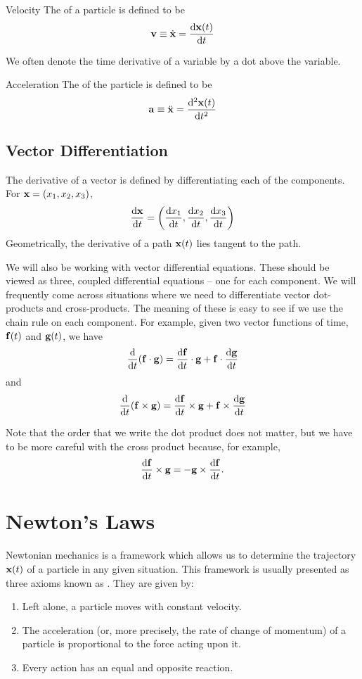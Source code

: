 \begin{defn}{Velocity}{}
The  of a particle is defined to be
\begin{equation}
\vb{v} \equiv \dot{\vb{x}} = \dv{\vb{x}(t)}{t}
\end{equation}
\end{defn}

\begin{notation}
We often denote the time derivative of a variable by a dot above the variable.
\end{notation}

\begin{defn}{Acceleration}{}
The  of the particle is defined to be
\begin{equation}
\vb{a} \equiv \ddot{\vb{x}} = \dv[2]{\vb{x}(t)}{t}
\end{equation}
\end{defn}

\subsection*{Vector Differentiation}
The derivative of a vector is defined by differentiating each of the components. For $\vb{x} = (x_1, x_2, x_3)$,
\[ \dv{\vb{x}}{t} = \left(\dv{x_1}{t}, \dv{x_2}{t}, \dv{x_3}{t}\right) \]
Geometrically, the derivative of a path $\vb{x}(t)$ lies tangent to the path.

We will also be working with vector differential equations. These should be viewed as three, coupled differential equations -- one for each component. We will frequently come across situations where we need to differentiate vector dot-products and cross-products. The meaning of these is easy to see if we use the chain rule on each component. For example, given two vector functions of time, $\vb{f}(t)$ and $\vb{g}(t)$, we have
\[ \odv*{(\vb{f}\cdot\vb{g})}{t} = \dv{\vb{f}}{t}\cdot \vb{g}+\vb{f}\cdot\dv{\vb{g}}{t} \]
and
\[ \odv*{(\vb{f}\times\vb{g})}{t} = \dv{\vb{f}}{t}\times\vb{g}+\vb{f}\times\dv{\vb{g}}{t} \]

Note that the order that we write the dot product does not matter, but we have to be more careful with the cross product because, for example, 
\[ \dv{\vb{f}}{t} \times \vb{g} = -\vb{g} \times \dv{\vb{f}}{t}. \]

\section{Newton's Laws}
Newtonian mechanics is a framework which allows us to determine the trajectory $\vb{x}(t)$ of a particle in any given situation. This framework is usually presented as three axioms known as . They are given by:
\begin{enumerate}[label=\textbf{N\arabic*}]
\item Left alone, a particle moves with constant velocity.
\item The acceleration (or, more precisely, the rate of change of momentum) of a particle is proportional to the force acting upon it.
\item Every action has an equal and opposite reaction.
\end{enumerate}

